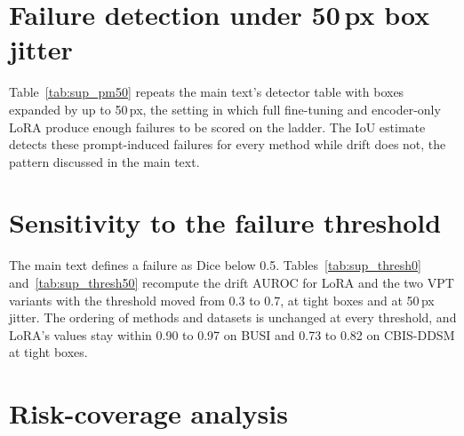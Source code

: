 \documentclass[runningheads]{llncs}
\begin{document}
\section{Failure detection under 50\,px box jitter}
\label{sup:pm50}

Table~\ref{tab:sup_pm50} repeats the main text's detector table with boxes expanded by up to 50\,px, the setting in which full fine-tuning and encoder-only LoRA produce enough failures to be scored on the ladder. The IoU estimate detects these prompt-induced failures for every method while drift does not, the pattern discussed in the main text.

\begin{table}[htbp]
  \centering
  \caption{AUROC / AUPRC for detecting per-image failures (Dice below 0.5) at 50\,px box jitter. Cells with fewer than 20 failures omitted; drift is zero by construction for zero-shot.}
  \label{tab:sup_pm50}
  
\end{table}

\section{Sensitivity to the failure threshold}
\label{sup:thresh}

The main text defines a failure as Dice below 0.5. Tables~\ref{tab:sup_thresh0} and~\ref{tab:sup_thresh50} recompute the drift AUROC for LoRA and the two VPT variants with the threshold moved from 0.3 to 0.7, at tight boxes and at 50\,px jitter. The ordering of methods and datasets is unchanged at every threshold, and LoRA's values stay within 0.90 to 0.97 on BUSI and 0.73 to 0.82 on CBIS-DDSM at tight boxes.

\begin{table}[htbp]
  \centering
  \caption{Drift AUROC as a function of the Dice threshold that defines a failure, tight boxes.}
  \label{tab:sup_thresh0}
  
\end{table}

\begin{table}[htbp]
  \centering
  \caption{As Table~\ref{tab:sup_thresh0}, at 50\,px box jitter.}
  \label{tab:sup_thresh50}
  
\end{table}

\section{Risk-coverage analysis}
\label{sup:rc}
\end{document}
